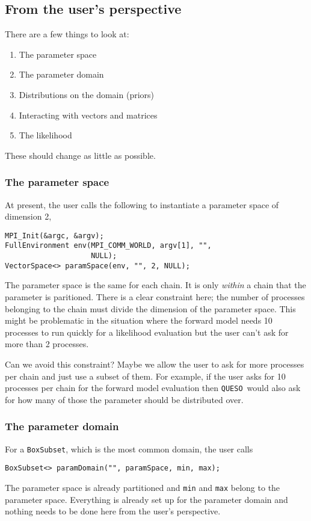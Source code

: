 \documentclass{article}
\newcommand{\Queso}{\texttt{QUESO}}
\begin{document}
\subsection{From the user's perspective}

There are a few things to look at:
\begin{enumerate}
  \item The parameter space
  \item The parameter domain
  \item Distributions on the domain (priors)
  \item Interacting with vectors and matrices
  \item The likelihood
\end{enumerate}
These should change as little as possible.

\subsubsection{The parameter space}

At present, the user calls the following to instantiate a parameter space of
dimension 2,
\begin{lstlisting}
MPI_Init(&argc, &argv);
FullEnvironment env(MPI_COMM_WORLD, argv[1], "",
                    NULL);
VectorSpace<> paramSpace(env, "", 2, NULL);
\end{lstlisting}
The parameter space is the same for each chain.  It is only \emph{within} a
chain that the parameter is paritioned.  There is a clear constraint here; the
number of processes belonging to the chain must divide the dimension of the
parameter space.  This might be problematic in the situation where the forward
model needs 10 processes to run quickly for a likelihood evaluation but the
user can't ask for more than 2 processes.

Can we avoid this constraint?  Maybe we allow the user to ask for more
processes per chain and just use a subset of them.  For example, if the user
asks for 10 processes per chain for the forward model evaluation then \Queso\
would also ask for how many of those the parameter should be distributed over.

\subsubsection{The parameter domain}

For a \lstinline|BoxSubset|, which is the most common domain, the user calls
\begin{lstlisting}
BoxSubset<> paramDomain("", paramSpace, min, max);
\end{lstlisting}
The parameter space is already partitioned and \lstinline|min| and
\lstinline|max| belong to the parameter space.  Everything is already set up
for the parameter domain and nothing needs to be done here from the user's
perspective.
\end{document}
